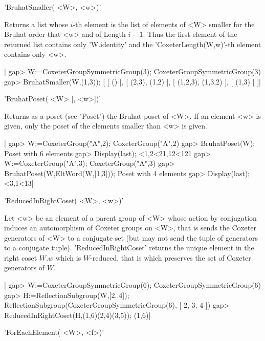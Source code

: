 'BruhatSmaller( <W>, <w>)'

Returns  a list  whose $i$-th  element is  the list  of elements  of <W>
smaller for  the Bruhat  order that  <w> and of  Length $i-1$.  Thus the
first element  of the returned  list contains only 'W.identity'  and the
'CoxeterLength(W,w)'-th element contains only <w>.

|    gap> W:=CoxeterGroupSymmetricGroup(3);
    CoxeterGroupSymmetricGroup(3)
    gap> BruhatSmaller(W,(1,3));
    [ [ () ], [ (2,3), (1,2) ], [ (1,2,3), (1,3,2) ], [ (1,3) ] ]|


'BruhatPoset( <W> [, <w>])'

Returns as a poset (see "Poset") the Bruhat poset of <W>. If an element <w>
is given, only the poset of the elements smaller than <w> is given.

|    gap> W:=CoxeterGroup("A",2);
    CoxeterGroup("A",2)
    gap> BruhatPoset(W);
    Poset with 6 elements
    gap> Display(last);
    <1,2<21,12<121
    gap> W:=CoxeterGroup("A",3);
    CoxeterGroup("A",3)
    gap> BruhatPoset(W,EltWord(W,[1,3]));
    Poset with 4 elements
    gap> Display(last);
    <3,1<13|


'ReducedInRightCoset( <W>, <w>)'

Let  <w>  be an  element  of  a parent  group  of  <W> whose  action  by
conjugation induces  an automorphism of  Coxeter groups on <W>,  that is
sends the Coxeter generators of <W> to a conjugate set (but may not send
the  tuple of  generators to  a conjugate  tuple). 'ReducedInRightCoset'
returns  the  unique   element  in  the  right  coset   $W.w$  which  is
$W$-reduced, that  is which preserves  the set of Coxeter  generators of
$W$.

|    gap> W:=CoxeterGroupSymmetricGroup(6);
    CoxeterGroupSymmetricGroup(6)
    gap> H:=ReflectionSubgroup(W,[2..4]);
    ReflectionSubgroup(CoxeterGroupSymmetricGroup(6), [ 2, 3, 4 ])
    gap> ReducedInRightCoset(H,(1,6)(2,4)(3,5));
    (1,6)|


'ForEachElement( <W>, <f>)'

